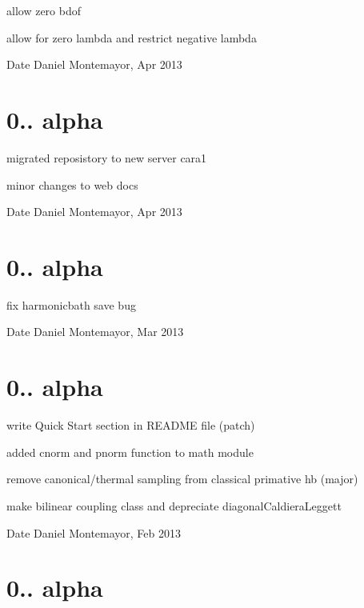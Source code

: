 \begin{DoxyItemize}
\item allow zero bdof
\item allow for zero lambda and restrict negative lambda \begin{DoxyDate}{Date}
Daniel Montemayor, Apr 2013
\end{DoxyDate}

\end{DoxyItemize}\hypertarget{_tags_v0_1_41a}{}\section{0.. alpha}\label{_tags_v0_1_41a}

\begin{DoxyItemize}
\item migrated reposistory to new server cara1
\item minor changes to web docs \begin{DoxyDate}{Date}
Daniel Montemayor, Apr 2013
\end{DoxyDate}

\end{DoxyItemize}\hypertarget{_tags_v0_1_4a}{}\section{0.. alpha}\label{_tags_v0_1_4a}

\begin{DoxyItemize}
\item fix harmonicbath save bug \begin{DoxyDate}{Date}
Daniel Montemayor, Mar 2013
\end{DoxyDate}

\end{DoxyItemize}\hypertarget{_tags_v0_1_3a}{}\section{0.. alpha}\label{_tags_v0_1_3a}

\begin{DoxyItemize}
\item write Quick Start section in R\+E\+A\+D\+M\+E file (patch)
\item added cnorm and pnorm function to math module
\item remove canonical/thermal sampling from classical primative hb (major)
\item make bilinear coupling class and depreciate diagonal\+Caldiera\+Leggett \begin{DoxyDate}{Date}
Daniel Montemayor, Feb 2013
\end{DoxyDate}

\end{DoxyItemize}\hypertarget{_tags_v0_1_2a}{}\section{0.. alpha}\label{_tags_v0_1_2a}


